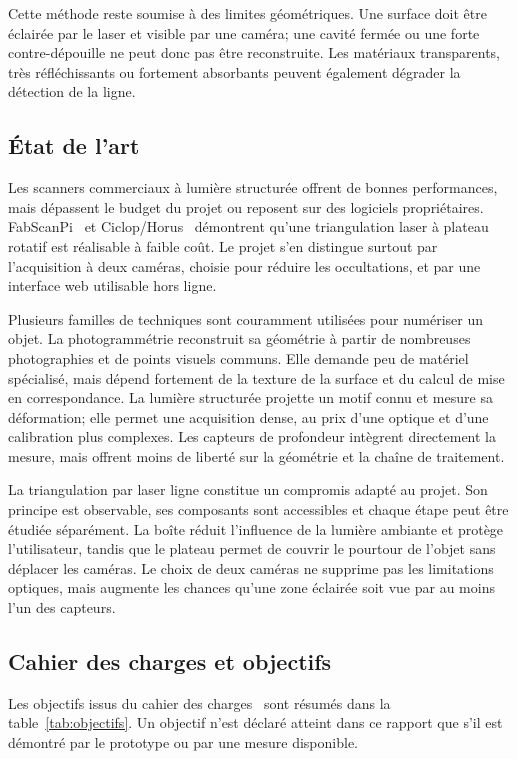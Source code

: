 Cette méthode reste soumise à des limites géométriques. Une surface doit être
éclairée par le laser et visible par une caméra; une cavité fermée ou une forte
contre-dépouille ne peut donc pas être reconstruite. Les matériaux
transparents, très réfléchissants ou fortement absorbants peuvent également
dégrader la détection de la ligne.

\subsection{État de l'art}

Les scanners commerciaux à lumière structurée offrent de bonnes performances,
mais dépassent le budget du projet ou reposent sur des logiciels propriétaires.
FabScanPi~\cite{fabscanpi} et Ciclop/Horus~\cite{ciclop} démontrent qu'une
triangulation laser à plateau rotatif est réalisable à faible coût. Le projet
s'en distingue surtout par l'acquisition à deux caméras, choisie pour réduire
les occultations, et par une interface web utilisable hors ligne.

Plusieurs familles de techniques sont couramment utilisées pour numériser un
objet. La photogrammétrie reconstruit sa géométrie à partir de nombreuses
photographies et de points visuels communs. Elle demande peu de matériel
spécialisé, mais dépend fortement de la texture de la surface et du calcul de
mise en correspondance. La lumière structurée projette un motif connu et
mesure sa déformation; elle permet une acquisition dense, au prix d'une
optique et d'une calibration plus complexes. Les capteurs de profondeur
intègrent directement la mesure, mais offrent moins de liberté sur la
géométrie et la chaîne de traitement.

La triangulation par laser ligne constitue un compromis adapté au projet. Son
principe est observable, ses composants sont accessibles et chaque étape peut
être étudiée séparément. La boîte réduit l'influence de la lumière ambiante
et protège l'utilisateur, tandis que le plateau permet de couvrir le pourtour
de l'objet sans déplacer les caméras. Le choix de deux caméras ne supprime pas
les limitations optiques, mais augmente les chances qu'une zone éclairée soit
vue par au moins l'un des capteurs.

\subsection{Cahier des charges et objectifs}

Les objectifs issus du cahier des charges~\cite{cdc} sont résumés dans la
table~\ref{tab:objectifs}. Un objectif n'est déclaré atteint dans ce rapport que
s'il est démontré par le prototype ou par une mesure disponible.

